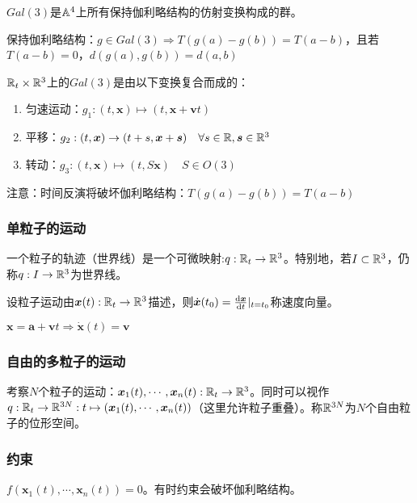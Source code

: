 \documentclass{ctexbook}
\begin{document}
\begin{Def}[伽利略群]
 $Gal(3)$是$\mathbb{A}^{4}$上所有保持伽利略结构的仿射变换构成的群。
\end{Def}
\begin{Rmk}
  保持伽利略结构：$g\in Gal(3)\Rightarrow T(g(a)-g(b))=T(a-b)$，且若$T(a-b)=0$，$d(g(a),g(b))=d(a,b)$
\end{Rmk}

\begin{Prop}
  $\mathbb{R}_{t}\times\mathbb{R}^{3}$上的$Gal(3)$是由以下变换复合而成的：
  \begin{enumerate}
  \item 匀速运动：$g_{1}:(t,\bm x)\mapsto (t,\bm x+\bm v t)$
  \item 平移：$g_{2}:(t,\bm x)\to (t+s,\bm x+\bm s)\quad\forall s\in\mathbb{R},\bm s\in\mathbb{R}^{3}$
  \item 转动：$g_{3}:(t,\bm{x})\mapsto (t,S\bm x)\quad S\in O(3)$
  \end{enumerate}
\end{Prop}
注意：时间反演将破坏伽利略结构：$T(g(a)-g(b))=T(a-b)$

\subsubsection{单粒子的运动}
\begin{Def}[世界线]
  一个粒子的轨迹（世界线）是一个可微映射:$q:\mathbb{R}_{t}\to\mathbb{R}^{3}$。特别地，若$I\subset \mathbb{R}^{3}$，仍称$q:I\to \mathbb{R}^{3}$为世界线。
\end{Def}

\begin{Def}[速度]
  设粒子运动由$\bm x(t):\mathbb{R}_{t}\to\mathbb{R}^{3}$描述，则$\dot{\bm{x}}(t_{0})=\frac{\mathrm{d}\bm x}{\mathrm{d}t}|_{t=t_{0}}$称速度向量。
\end{Def}

\begin{Eg}
  $\bm x=\bm a+\bm v t\Rightarrow \dot{\bm x}(t)=\bm v$
\end{Eg}

\subsubsection{自由的多粒子的运动}
考察$N$个粒子的运动：$\bm x_{1}(t),\cdots,\bm x_{n}(t):\mathbb{R}_{t}\to \mathbb{R}^{3}$。同时可以视作$q:\mathbb{R}_{t}\to\mathbb{R}^{3N}:t\mapsto (\bm x_{1}(t),\cdots,\bm x_{n}(t))$（这里允许粒子重叠）。称$\mathbb{R}^{3N}$为$N$个自由粒子的位形空间。

\subsubsection{约束}
$f(\bm x_{1}(t),\cdots,\bm x_{n}(t))=0$。有时约束会破坏伽利略结构。
\end{document}
